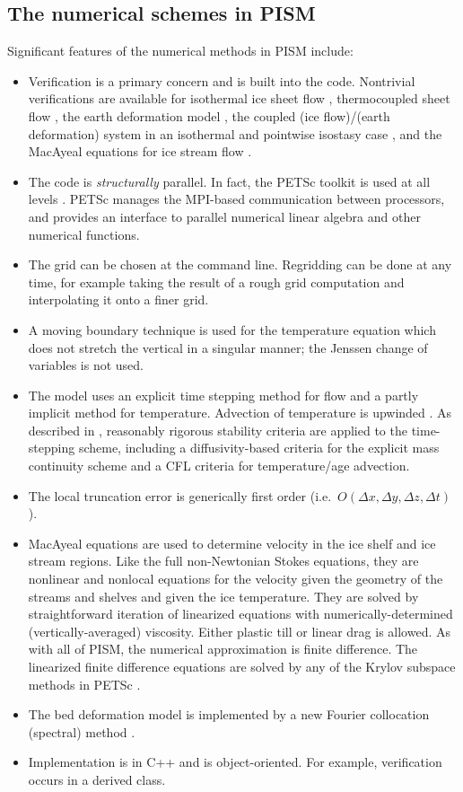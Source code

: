 \documentclass[12pt,final]{amsart}
\begin{document}
\subsection{The numerical schemes in PISM}  Significant features of the numerical methods in PISM include:\begin{itemize}
\item Verification \cite{Roache} is a primary concern and is built into the code.  Nontrivial verifications are available for isothermal ice sheet flow \cite{BLKCB}, thermocoupled sheet flow \cite{BB,BBL}, the earth deformation model \cite{BLKfastearth}, the coupled (ice flow)/(earth deformation) system in an isothermal and pointwise isostasy  case \cite{BLKfastearth}, and the MacAyeal equations for ice stream flow \cite{SchoofStream,BrownPresentation}.
\item The code is \emph{structurally} parallel.  In fact, the PETSc toolkit is used at all levels \cite{petsc-user-ref}.  PETSc manages the MPI-based communication between processors, and provides an interface to parallel numerical linear algebra and other numerical functions.
\item The grid can be chosen at the command line.  Regridding can be done at any time, for example taking the result of a rough grid computation and interpolating it onto a finer grid.
\item A moving boundary technique is used for the temperature equation which does not stretch the vertical in a singular manner; the Jenssen \cite{Jenssen} change of variables is not used.
\item The model uses an explicit time stepping method for flow and a partly implicit method for temperature.  Advection of temperature is upwinded \cite{MortonMayers}.  As described  in  \cite{BBL}, reasonably rigorous stability criteria are applied to the time-stepping scheme, including a diffusivity-based criteria for the explicit mass continuity scheme and a CFL criteria \cite{MortonMayers} for temperature/age advection.
\item The local truncation error is generically first order (i.e.~$O(\Delta x,\Delta y,\Delta z,\Delta t)$).
\item MacAyeal equations \cite{MacAyeal,SchoofStream} are used to determine velocity in the ice shelf and ice stream regions.  Like the full non-Newtonian Stokes equations, they are nonlinear and nonlocal equations for the velocity given the geometry of the streams and shelves and given the ice temperature.  They are solved by straightforward iteration of linearized equations with numerically-determined (vertically-averaged) viscosity.  Either plastic till or linear drag is allowed.  As with all of PISM, the numerical approximation is finite difference.  The linearized finite difference equations are solved by any of the Krylov subspace methods in PETSc \cite{BrownPresentation,petsc-user-ref}.
\item The bed deformation model is implemented by a new Fourier collocation (spectral) method \cite{BLKfastearth}.
\item Implementation is in C++ and is object-oriented.  For example, verification occurs in a derived class.
\end{itemize}
\end{document}
